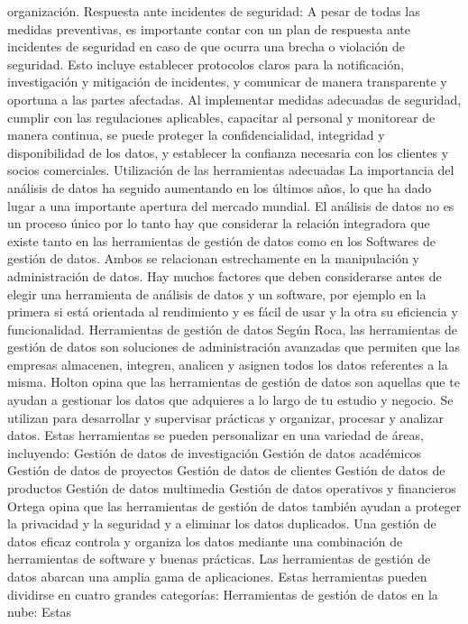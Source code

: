 \documentclass[
  letterpaper,
  DIV=11,
  numbers=noendperiod]{scrreprt}
\begin{document}
organización. Respuesta ante incidentes de seguridad: A pesar de todas
las medidas preventivas, es importante contar con un plan de respuesta
ante incidentes de seguridad en caso de que ocurra una brecha o
violación de seguridad. Esto incluye establecer protocolos claros para
la notificación, investigación y mitigación de incidentes, y comunicar
de manera transparente y oportuna a las partes afectadas. Al implementar
medidas adecuadas de seguridad, cumplir con las regulaciones aplicables,
capacitar al personal y monitorear de manera continua, se puede proteger
la confidencialidad, integridad y disponibilidad de los datos, y
establecer la confianza necesaria con los clientes y socios comerciales.
Utilización de las herramientas adecuadas La importancia del análisis de
datos ha seguido aumentando en los últimos años, lo que ha dado lugar a
una importante apertura del mercado mundial. El análisis de datos no es
un proceso único por lo tanto hay que considerar la relación integradora
que existe tanto en las herramientas de gestión de datos como en los
Softwares de gestión de datos. Ambos se relacionan estrechamente en la
manipulación y administración de datos. Hay muchos factores que deben
considerarse antes de elegir una herramienta de análisis de datos y un
software, por ejemplo en la primera si está orientada al rendimiento y
es fácil de usar y la otra su eficiencia y funcionalidad. Herramientas
de gestión de datos Según Roca, las herramientas de gestión de datos son
soluciones de administración avanzadas que permiten que las empresas
almacenen, integren, analicen y asignen todos los datos referentes a la
misma. Holton opina que las herramientas de gestión de datos son
aquellas que te ayudan a gestionar los datos que adquieres a lo largo de
tu estudio y negocio. Se utilizan para desarrollar y supervisar
prácticas y organizar, procesar y analizar datos. Estas herramientas se
pueden personalizar en una variedad de áreas, incluyendo: Gestión de
datos de investigación Gestión de datos académicos Gestión de datos de
proyectos Gestión de datos de clientes Gestión de datos de productos
Gestión de datos multimedia Gestión de datos operativos y financieros
Ortega opina que las herramientas de gestión de datos también ayudan a
proteger la privacidad y la seguridad y a eliminar los datos duplicados.
Una gestión de datos eficaz controla y organiza los datos mediante una
combinación de herramientas de software y buenas prácticas. Las
herramientas de gestión de datos abarcan una amplia gama de
aplicaciones. Estas herramientas pueden dividirse en cuatro grandes
categorías: Herramientas de gestión de datos en la nube: Estas
\end{document}
